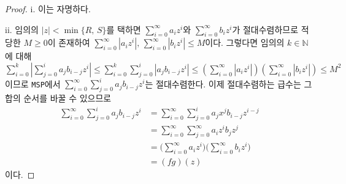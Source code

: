 \begin{proof}
    i. 이는 자명하다.

    ii. 임의의 $|z|<\min\{R,\,S\}$를 택하면 $\sum_{i=0}^\infty a_iz^i$와 $\sum_{i=0}^\infty b_iz^i$가 절대수렴하므로 적당한 $M\geq0$이 존재하여 $\sum_{i=0}^\infty|a_iz^i|,\,\sum_{i=0}^\infty|b_iz^i|\leq M$이다. 그렇다면 임의의 $k\in\mathbb{N}$에 대해 $\sum_{i=0}^k|\sum_{j=0}^ia_jb_{i-j}z^i|\leq\sum_{i=0}^k\sum_{j=0}^i|a_jb_{i-j}z^i|\leq(\sum_{i=0}^\infty|a_iz^i|)(\sum_{i=0}^\infty|b_iz^i|)\leq M^2$이므로 \texttt{MSP}에서 $\sum_{i=0}^\infty\sum_{j=0}^ia_jb_{i-j}z^i$는 절대수렴한다. 이제 절대수렴하는 급수는 그 합의 순서를 바꿀 수 있으므로
    \begin{align*}
        \sum_{i=0}^\infty\sum_{j=0}^ia_jb_{i-j}z^i&=\sum_{i=0}^\infty\sum_{j=0}^ia_jx^jb_{i-j}z^{i-j}\\
        &=\sum_{i=0}^\infty\sum_{j=0}^\infty a_iz^ib_jz^j\\
        &=\bigg(\sum_{i=0}^\infty a_iz^i\bigg)\bigg(\sum_{i=0}^\infty b_iz^i\bigg)\\
        &=(fg)(z)
    \end{align*}
    이다.


\end{proof}
